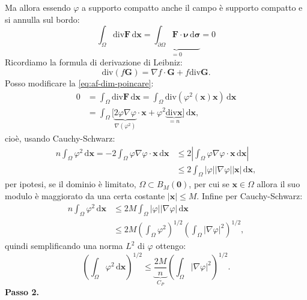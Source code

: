 \documentclass[10pt,a4paper,twoside,openright]{book}
\newcommand{\x}{\mathbf{x}}
\newcommand{\zer}{\mathbf{0}}
\newcommand{\sigg}{\bm{\sigma}}
\newcommand{\de}{\,\mathrm d}
\newcommand{\dxx}{\de \x}
\newcommand{\dsig}{\de \sigg}
\begin{document}
\begin{dimostrazione}
	Ma allora essendo $\varphi $ a supporto compatto anche il campo è supporto compatto e si annulla sul bordo:
	\begin{equation}
		\int _{\Omega }\mathrm{div}\mathbf{F} \dxx =\underbrace{\int _{\partial \Omega }\mathbf{F} \cdotp \bm{\nu }\dsig }_{=0} =0
		\label{eq:af-dim-poincare}
	\end{equation}
	Ricordiamo la formula di derivazione di Leibniz:
	\begin{equation*}
		\mathrm{div}(f\mathbf{G}) =\nabla f\cdotp \mathbf{G} +f\mathrm{div}\mathbf{G} .
	\end{equation*}
	Posso modificare la \eqref{eq:af-dim-poincare}:
	\begin{align*}
		0 & =\int _{\Omega }\mathrm{div}\mathbf{F} \dxx =\int _{\Omega }\mathrm{div}\left(\varphi ^{2}(\x)\x\right) \dxx                                              \\
		  & =\int _{\Omega }\big[\underbrace{2\varphi \nabla \varphi }_{\nabla \left(\varphi ^{2}\right)} \cdotp \x +\varphi ^{2}\underbrace{\mathrm{div}\x}_{=n}\big] \dxx , 
	\end{align*}
	cioè, usando Cauchy-Schwarz:
	\begin{align*}
		n\int _{\Omega } \varphi ^{2} \dxx =-2\int _{\Omega } \varphi \nabla \varphi \cdotp \x \dxx & \leqslant 2\left| \int _{\Omega } \varphi \nabla \varphi \cdotp \x \dxx\right| \\
		                                                                                                                    & \leqslant 2\int _{\Omega }| \varphi | | \nabla \varphi | | \x| \dxx ,          
	\end{align*}
	per ipotesi, se il dominio è limitato, $\displaystyle \Omega \subset B_{M}(\zer)$, per cui se $\displaystyle \x \in \Omega $ allora il suo modulo è maggiorato da una certa costante $\displaystyle | \x| \leqslant M$. Infine per Cauchy-Schwarz:
	\begin{align*}
		n\int _{\Omega } \varphi ^{2} \dxx & \leqslant 2M\int _{\Omega }| \varphi | | \nabla \varphi | \dxx                                                  \\
		                                          & \leqslant 2M\left(\int _{\Omega } \varphi ^{2}\right)^{1/2}\left(\int _{\Omega }| \nabla \varphi | ^{2}\right)^{1/2} , 
	\end{align*}
	quindi semplificando una norma $\displaystyle L^{2}$ di $\displaystyle \varphi $ ottengo:
	\begin{equation*}
		\left(\int _{\Omega } \varphi ^{2} \dxx\right)^{1/2} \leqslant \underbrace{\frac{2M}{n}}_{C_{P}}\left(\int _{\Omega }| \nabla \varphi | ^{2}\right)^{1/2} .
	\end{equation*}
	\textbf{Passo 2.}
	

\end{dimostrazione}
\end{document}
